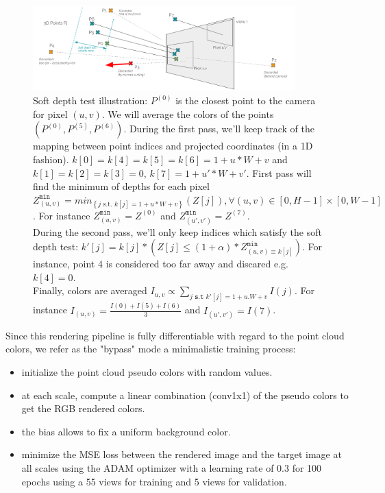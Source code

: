 \begin{figure}[h]
    \centering
    \includegraphics[width=0.9\textwidth]{figures/soft_depth_test_two_pixels.png}
    \caption{Soft depth test illustration: 
    $P^{(0)}$ is the closest point to the camera for pixel $(u,v)$. We will average the colors of the points $(P^{(0)}, P^{(5)}, P^{(6)})$. During the first pass, we'll keep track of the mapping between point indices and projected coordinates (in a 1D fashion). $k[0]=k[4]=k[5]=k[6]=1+u*W+v$ and $k[1]=k[2]=k[3]=0$, $k[7] = 1+u'*W+v'$. First pass will find the minimum of depths for each pixel $Z^{\texttt{min}}_{(u,v)} = min_{\left\{j  \text{ s.t. } k[j]=1+u*W+v\right\}} \left(Z[j]\right), \forall (u,v) \in \left[0, H-1\right] \times \left[0, W-1\right]$. For instance $Z^{\texttt{min}}_{(u,v)} = Z^{(0)}$ and $Z^{\texttt{min}}_{(u',v')} = Z^{(7)}$. \\ During the second pass, we'll only keep indices which satisfy the soft depth test: $ k'[j] = k[j] * \left(Z[j] \leq (1+\alpha) *Z^{\texttt{min}}_{(u,v) \equiv k[j]}\right)$.
   For instance, point 4 is considered too far away and discared e.g. $k[4]=0$. \\Finally, colors are averaged $I_{u, v} \propto \sum_{j \texttt{ s.t  } k'[j]=1+u.W+v}{I(j)}$. For instance $I_{(u, v)} = \frac{I(0) + I(5) + I(6)}{3}$ and $I_{(u', v')} = I(7)$.}
    \label{fig:soft_depth_test}
\end{figure}

Since this rendering pipeline is fully differentiable with regard to the point cloud colors, we refer as the "bypass" mode a minimalistic training process: 
\begin{itemize}
    \item initialize the point cloud pseudo colors with random values.
    \item at each scale, compute a linear combination (conv1x1) of the pseudo colors to get the RGB rendered colors.
    \item the bias allows to fix a uniform background color.
    \item minimize the MSE loss between the rendered image and the target image at all scales using the ADAM optimizer with a learning rate of $0.3$ for 100 epochs using a 55 views for training and 5 views for validation.
\end{itemize} 

